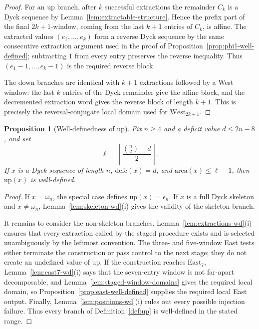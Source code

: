 \documentclass[11pt]{article}
\theoremstyle{plain}
\newtheorem{proposition}[theorem]{Proposition}
\theoremstyle{definition}
\theoremstyle{remark}
\newcommand{\area}{\mathrm{area}}
\newcommand{\defc}{\mathrm{defc}}
\begin{document}
\begin{proof}
For an \(\mathrm{up}\) branch, after \(k\) successful extractions the remainder
\(C_k\) is a Dyck sequence by Lemma~\ref{lem:extractable-structure}.  Hence the
prefix part of the final \(2k+1\)-window, coming from the last \(k+1\) entries
of \(C_k\), is affine.  The extracted values
\((e_1,\ldots,e_k)\) form a reverse Dyck sequence by the same consecutive
extraction argument used in the proof of
Proposition~\ref{prop:phi1-well-defined}; subtracting \(1\) from every entry
preserves the reverse inequality.  Thus
\((e_1-1,\ldots,e_k-1)\) is the required reverse block.

The \(\mathrm{down}\) branches are identical with \(k+1\) extractions followed
by a West window: the last \(k\) entries of the Dyck remainder give the affine
block, and the decremented extraction word gives the reverse block of length
\(k+1\).  This is precisely the reversal-conjugate local domain used for
\(\mathrm{West}_{2k+1}\).
\end{proof}

\begin{proposition}[Well-definedness of \(\mathrm{up}\)]
\label{prop:up-wd}
Fix \(n\ge 4\) and a deficit value \(d\le 2n-8\), and set
\[
  \ell=\left\lfloor\frac{\binom n2-d}{2}\right\rfloor.
\]
If \(x\) is a Dyck sequence of length \(n\), \(\defc(x)=d\), and
\(\area(x)\le \ell-1\), then \(\mathrm{up}(x)\) is well-defined.
\end{proposition}

\begin{proof}
If \(x=\omega_n\), the special case defines \(\mathrm{up}(x)=\epsilon_n\).
If \(x\) is a full Dyck skeleton and \(x\ne\omega_n\),
Lemma~\ref{lem:skeleton-wd}\textup{(i)} gives the validity of the skeleton
branch.

It remains to consider the non-skeleton branches.  Lemma~\ref{lem:extractions-wd}\textup{(i)}
ensures that every extraction called by the staged procedure exists and is
selected unambiguously by the leftmost convention.  The three- and five-window
East tests either terminate the construction or pass control to the next stage;
they do not create an undefined value of \(\mathrm{up}\).  If the construction
reaches \(\mathrm{East}_7\), Lemma~\ref{lem:east7-wd}\textup{(i)} says that
the seven-entry window is not far-apart decomposable, and
Lemma~\ref{lem:staged-window-domains} gives the required local domain, so
Proposition~\ref{prop:east-well-defined} supplies the required local East
output.  Finally, Lemma~\ref{lem:positions-wd}\textup{(i)} rules out every
possible injection failure.  Thus every branch of Definition~\ref{def:up} is
well-defined in the stated range.
\end{proof}
\end{document}
